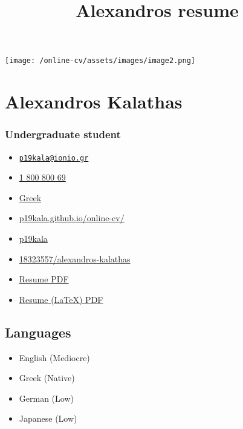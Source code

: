 \documentclass[]{article}
\title{Alexandros resume}
\date{}
\providecommand{\tightlist}{%
  \setlength{\itemsep}{0pt}\setlength{\parskip}{0pt}}
\begin{document}
\maketitle

\texttt{[image: /online-cv/assets/images/image2.png]}

\section{Alexandros Kalathas}\label{alexandros-kalathas}

\subsubsection{Undergraduate student}\label{undergraduate-student}

\begin{itemize}
\tightlist
\item
  \emph{} \href{mailto:p19kala@ionio.gr}{\nolinkurl{p19kala@ionio.gr}}
\item
  \emph{} \href{tel:1\%20800\%20800\%2069}{1 800 800 69}
\item
  \emph{} \href{}{Greek}
\item
  \emph{}
  \href{http://p19kala.github.io/online-cv/}{p19kala.github.io/online-cv/}
\item
  \emph{} \href{http://github.com/p19kala}{p19kala}
\item
  \emph{}
  \href{https://stackoverflow.com/users/18323557/alexandros-kalathas}{18323557/alexandros-kalathas}
\item
  \emph{}
  \href{https://raw.githubusercontent.com/p19kala/online-cv/gh-pages/assets/pdf/Alexandros-resume.pdf}{Resume
  PDF}
\item
  \emph{}
  \href{https://raw.githubusercontent.com/p19kala/online-cv/gh-pages/assets/pdf/cv.pdf}{Resume
  (LaTeX) PDF}
\end{itemize}

\subsection{Languages}\label{languages}

\begin{itemize}
\tightlist
\item
  English {(Mediocre)}
\item
  Greek {(Native)}
\item
  German {(Low)}
\item
  Japanese {(Low)}
\end{itemize}
\end{document}
